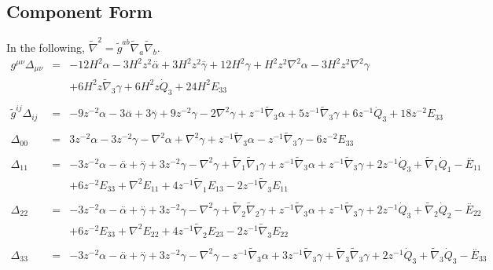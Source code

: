 \documentclass[10pt,letterpaper]{article}
\numberwithin{equation}{section}
\begin{document}
\subsection*{Component Form}
In the following, $\tilde\nabla^{2} = \tilde g^{ab} \tilde\nabla_a\tilde\nabla_b$. 
\begin{eqnarray}
g^{\mu\nu}\Delta_{\mu\nu}&=& -12 H^2 \alpha - 3 H^2 z^2 \overset{..}{\alpha} + 3 H^2 z^2 \overset{..}{\gamma} + 12 H^2 \gamma + H^2 z^2 \nabla^{2}{}\alpha - 3 H^2 z^2 \nabla^{2}{}\gamma \nonumber \\ 
&& + 6 H^2 z \tilde{\nabla}_{3}\gamma +6 H^2 z \dot{Q}_{3}+24 H^2 E_{33}
\\  \nonumber\\ 
\tilde g^{ij}\Delta_{ij}&=& -9 z^{-2} \alpha - 3 \overset{..}{\alpha} + 3 \overset{..}{\gamma} + 9 z^{-2} \gamma - 2 \nabla^{2}{}\gamma + z^{-1} \tilde{\nabla}_{3}\alpha + 5 z^{-1} \tilde{\nabla}_{3}\gamma +6 z^{-1} \dot{Q}_{3}+18 z^{-2} E_{33}
\\  \nonumber\\ 
\Delta_{00}&=& 3 z^{-2} \alpha - 3 z^{-2} \gamma -  \nabla^{2}{}\alpha + \nabla^{2}{}\gamma + z^{-1} \tilde{\nabla}_{3}\alpha -  z^{-1} \tilde{\nabla}_{3}\gamma -6 z^{-2} E_{33}
\\  \nonumber\\ 
\Delta_{11}&=& -3 z^{-2} \alpha -  \overset{..}{\alpha} + \overset{..}{\gamma} + 3 z^{-2} \gamma -  \nabla^{2}{}\gamma + \tilde{\nabla}_{1}\tilde{\nabla}_{1}\gamma + z^{-1} \tilde{\nabla}_{3}\alpha + z^{-1} \tilde{\nabla}_{3}\gamma +2 z^{-1} \dot{Q}_{3} + \tilde{\nabla}_{1}\dot{Q}_{1}- \overset{..}{E}_{11} \nonumber \\ 
&& + 6 z^{-2} E_{33} + \nabla^{2}{}E_{11} + 4 z^{-1} \tilde{\nabla}_{1}E_{13} - 2 z^{-1} \tilde{\nabla}_{3}E_{11}
\\  \nonumber\\ 
\Delta_{22}&=& -3 z^{-2} \alpha -  \overset{..}{\alpha} + \overset{..}{\gamma} + 3 z^{-2} \gamma -  \nabla^{2}{}\gamma + \tilde{\nabla}_{2}\tilde{\nabla}_{2}\gamma + z^{-1} \tilde{\nabla}_{3}\alpha + z^{-1} \tilde{\nabla}_{3}\gamma +2 z^{-1} \dot{Q}_{3} + \tilde{\nabla}_{2}\dot{Q}_{2}- \overset{..}{E}_{22} \nonumber \\ 
&& + 6 z^{-2} E_{33} + \nabla^{2}{}E_{22} + 4 z^{-1} \tilde{\nabla}_{2}E_{23} - 2 z^{-1} \tilde{\nabla}_{3}E_{22}
\\  \nonumber\\ 
\Delta_{33}&=& -3 z^{-2} \alpha -  \overset{..}{\alpha} + \overset{..}{\gamma} + 3 z^{-2} \gamma -  \nabla^{2}{}\gamma -  z^{-1} \tilde{\nabla}_{3}\alpha + 3 z^{-1} \tilde{\nabla}_{3}\gamma + \tilde{\nabla}_{3}\tilde{\nabla}_{3}\gamma +2 z^{-1} \dot{Q}_{3} + \tilde{\nabla}_{3}\dot{Q}_{3}- \overset{..}{E}_{33} \nonumber \\ 

\end{eqnarray}
\end{document}
